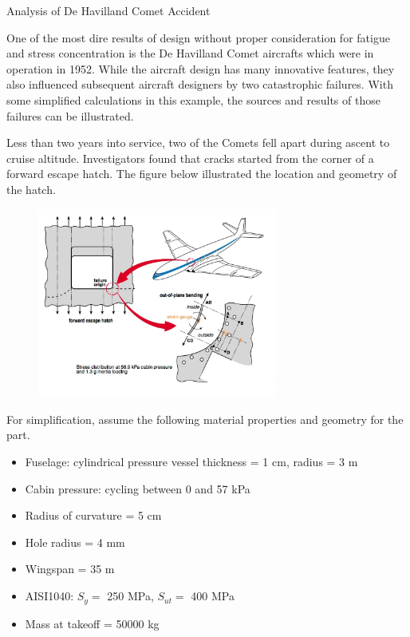 \documentclass[
10pt,
a4paper,
openany,
svgnames,
]{book}
\begin{document}
\begin{example} Analysis of De Havilland Comet Accident

  One of the most dire results of design without proper consideration for fatigue and stress concentration is the De Havilland Comet aircrafts which were in operation in 1952. While the aircraft design has many innovative features, they also influenced subsequent aircraft designers by two catastrophic failures. With some simplified calculations in this example, the sources and results of those failures can be illustrated.

  Less than two years into service, two of the Comets fell apart during ascent to cruise altitude. Investigators found that cracks started from the corner of a forward escape hatch. The figure below illustrated the location and geometry of the hatch.

  \begin{figure}[H]
    \centering
    \includegraphics[width=0.7\textwidth]{pictures/Static-body-load-analysis/de-havilland-analysis}
  \end{figure}

  For simplification, assume the following material properties and geometry for the part.
  
  \begin{itemize}
  \item Fuselage: cylindrical pressure vessel thickness = 1 cm, radius = 3 m
  \item Cabin pressure: cycling between 0 and 57 kPa
  \item Radius of curvature = 5 cm
  \item Hole radius = 4 mm
  \item Wingspan = 35 m
  \item AISI1040: $S_y =$ 250 MPa, $S_{ut} =$ 400 MPa
  \item Mass at takeoff = 50000 kg
  \end{itemize}


\end{example}
\end{document}
